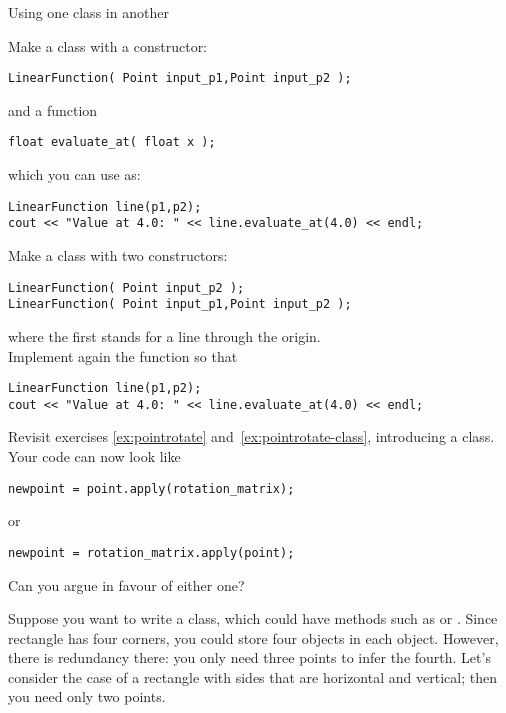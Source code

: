 {Using one class in another}
\label{sec:FuncHasPoint}
\label{sec:poly-rectangle}

\prerequisite{\ref{sec:hasa}}

\begin{exercise}
  \label{ex:geom:line}
  Make a class  with a constructor:
\begin{lstlisting}
LinearFunction( Point input_p1,Point input_p2 );
\end{lstlisting}
  and a function
\begin{lstlisting}
float evaluate_at( float x );
\end{lstlisting}
  which you can use as:
\begin{lstlisting}
LinearFunction line(p1,p2);
cout << "Value at 4.0: " << line.evaluate_at(4.0) << endl;
\end{lstlisting}
\end{exercise}

\begin{exercise}
  \label{ex:geom:line2}
  Make a class  with two constructors:
\begin{lstlisting}
LinearFunction( Point input_p2 );
LinearFunction( Point input_p1,Point input_p2 );
\end{lstlisting}
where the first stands for a line through the origin.\\
Implement again the  function so that
\begin{lstlisting}
LinearFunction line(p1,p2);
cout << "Value at 4.0: " << line.evaluate_at(4.0) << endl;
\end{lstlisting}
\end{exercise}

\begin{exercise}
  \label{ex:pointrotate-matrix}
  Revisit exercises \ref{ex:pointrotate}
  and~\ref{ex:pointrotate-class}, introducing a  class. Your
  code can now look like
\begin{lstlisting}
newpoint = point.apply(rotation_matrix);
\end{lstlisting}
  or
\begin{lstlisting}
newpoint = rotation_matrix.apply(point);
\end{lstlisting}
  Can you argue in favour of either one?
\end{exercise}

Suppose you want to write a  class, which could have methods such as
 or .
Since rectangle has four corners, you could store four 
objects in each  object. However, there is redundancy
there: you only need three points to infer the fourth. Let's consider
the case of a rectangle with sides that are horizontal and vertical;
then you need only two points.

